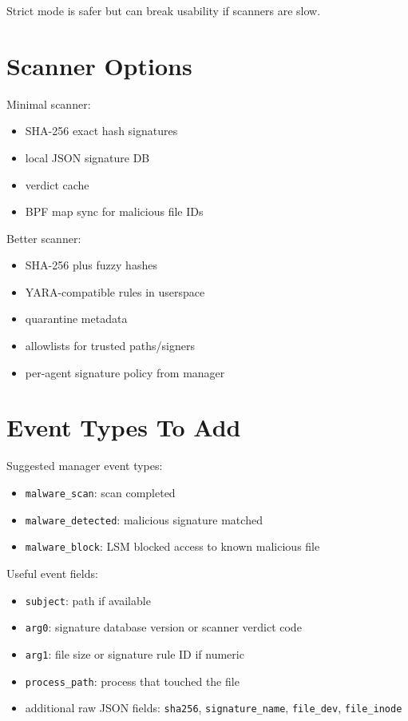 \documentclass[
  12pt,
]{report}
\providecommand{\tightlist}{%
  \setlength{\itemsep}{0pt}\setlength{\parskip}{0pt}}
\begin{document}
Strict mode is safer but can break usability if scanners are slow.

\section{Scanner Options}\label{scanner-options}

Minimal scanner:

\begin{itemize}
\tightlist
\item
  SHA-256 exact hash signatures
\item
  local JSON signature DB
\item
  verdict cache
\item
  BPF map sync for malicious file IDs
\end{itemize}

Better scanner:

\begin{itemize}
\tightlist
\item
  SHA-256 plus fuzzy hashes
\item
  YARA-compatible rules in userspace
\item
  quarantine metadata
\item
  allowlists for trusted paths/signers
\item
  per-agent signature policy from manager
\end{itemize}

\section{Event Types To Add}\label{event-types-to-add}

Suggested manager event types:

\begin{itemize}
\tightlist
\item
  \texttt{malware\_scan}: scan completed
\item
  \texttt{malware\_detected}: malicious signature matched
\item
  \texttt{malware\_block}: LSM blocked access to known malicious file
\end{itemize}

Useful event fields:

\begin{itemize}
\tightlist
\item
  \texttt{subject}: path if available
\item
  \texttt{arg0}: signature database version or scanner verdict code
\item
  \texttt{arg1}: file size or signature rule ID if numeric
\item
  \texttt{process\_path}: process that touched the file
\item
  additional raw JSON fields: \texttt{sha256}, \texttt{signature\_name},
  \texttt{file\_dev}, \texttt{file\_inode}
\end{itemize}
\end{document}
